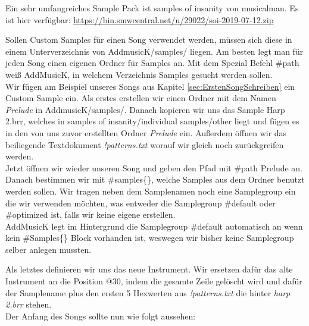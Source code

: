 \medskip

Ein sehr umfangreiches Sample Pack ist samples of insanity von musicalman. Es ist hier verfügbar:
\href{https://bin.smwcentral.net/u/29022/soi-2019-07-12.zip}{https://bin.smwcentral.net/u/29022/soi-2019-07-12.zip}

\bigskip

Sollen Custom Samples für einen Song verwendet werden, müssen sich diese in einem Unterverzeichnis von AddmusicK/samples/ liegen. Am besten legt man für jeden Song einen eigenen Ordner für Samples an. Mit dem Spezial Befehl \#path weiß AddMusicK, in welchem Verzeichnis Samples gesucht werden sollen. \\
Wir fügen am Beispiel unseres Songs aus Kapitel \ref{sec:ErstenSongSchreiben} ein Custom Sample ein. Als erstes erstellen wir einen Ordner mit dem Namen \textit{Prelude} in AddmusicK/samples/. Danach kopieren wir uns das Sample Harp 2.brr, welches in samples of insanity/individual samples/other liegt und fügen es in den von uns zuvor erstellten Ordner \textit{Prelude} ein. Außerdem öffnen wir das beiliegende Textdokument \textit{!patterns.txt} worauf wir gleich noch zurückgreifen werden. \\
Jetzt öffnen wir wieder unseren Song und geben den Pfad mit \#path  \dq Prelude\dq{} an. Danach bestimmen wir mit \#samples\{\}, welche Samples aus dem Ordner benutzt werden sollen. Wir tragen neben dem Samplenamen noch eine Samplegroup ein die wir verwenden möchten, was entweder die Samplegroup \#default oder \#optimized ist, falls wir keine eigene erstellen. \\
AddMusicK legt im Hintergrund die Samplegroup \#default automatisch an wenn kein \#Samples\{\} Block vorhanden ist, weswegen wir bisher keine Samplegroup selber anlegen mussten.


\medskip



\medskip

Als letztes definieren wir uns das neue Instrument. Wir ersetzen dafür das alte Instrument an die Position @30, indem  die gesamte Zeile gelöscht wird und dafür der Samplename plus den ersten 5 Hexwerten aus  \textit{!patterns.txt} die hinter  \textit{harp 2.brr} stehen. \\
Der Anfang des Songs sollte nun wie folgt aussehen:

\medskip

